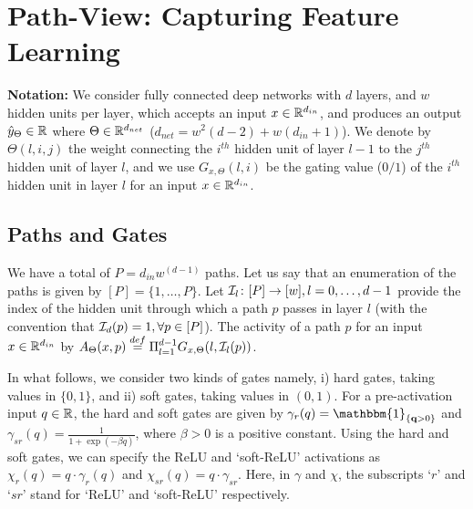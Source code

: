 \section{Path-View: Capturing Feature Learning}\label{sec:pathgate}
\textbf{Notation:} We consider fully connected deep networks with $d$ layers, and $w$ hidden units per layer, which accepts an input $x\in\mathbb{R}^{d_{in}}$, and produces an output $\hat{y}_{\Theta}\in \mathbb{R}$ where $\Theta\in\mathbb{R}^{d_{net}}$ ($d_{net}=w^2(d-2)+w(d_{in}+1)$). We denote by $\Theta(l,i,j)$ the weight connecting the $i^{th}$ hidden unit of layer $l-1$ to the $j^{th}$ hidden unit of layer $l$, and we use $G_{x,\Theta}(l,i)$ be the gating value ($0/1$) of the $i^{th}$ hidden unit in layer $l$ for an input $x\in \mathbb{R}^{d_{in}}$.
\subsection{Paths and Gates}
We have a total of $P=d_{in}w^{(d-1)}$ paths. Let us say that an enumeration of the paths is given by $[P]=\{1,\ldots,P\}$. Let $\mathcal{I}_{l}\colon [P]\rightarrow [w],l=0,\ldots,d-1$ provide the index of the hidden unit through which a path $p$ passes in layer $l$ (with the convention that $\mathcal{I}_d(p)=1,\forall p\in [P]$). The activity of a path $p$ for an input $x\in \mathbb{R}^{d_{in}}$ by $A_{\Theta}(x,p)\stackrel{def}{=}\Pi_{l=1}^{d-1} G_{x,\Theta}(l,\mathcal{I}_l(p))$.

In what follows, we consider two kinds of gates namely, i) hard gates, taking values in $\{0,1\}$, and ii) soft gates, taking values in $(0,1)$. For a pre-activation input $q\in\mathbb{R}$, the  hard and soft gates are given by $\gamma_{r}(q)=\mathbbm{1}_{\{\q>0\}}$ and $\gamma_{sr}(q)=\frac{1}{1+\exp(-\beta q)}$, where $\beta>0$ is a positive constant. Using the hard and soft gates, we can specify the ReLU and `soft-ReLU' activations as $\chi_{r}(q)=q\cdot\gamma_r(q)$ and $\chi_{sr}(q)=q\cdot\gamma_{sr}$. Here, in $\gamma$ and $\chi$, the subscripts `$r$' and `$sr$' stand for `ReLU' and `soft-ReLU' respectively.
